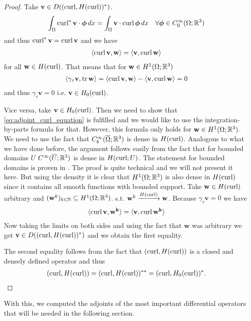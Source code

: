 \documentclass[../master_thesis.tex]{subfiles}
\begin{document}
\begin{proof}
    Take $\mathbf{v} \in D((\operatorname{curl}, H(\operatorname{curl}))^*)$. 
    \begin{align*}
        \int_\Omega \operatorname{curl}^*\mathbf{v} \cdot \boldsymbol{\phi} \, dx
        = \int_\Omega \mathbf{v} \cdot \operatorname{curl} \boldsymbol{\phi} \, dx
            \quad \forall \boldsymbol{\phi} \in C_0^\infty(\Omega;\mathbb{R}^3)
    \end{align*}
    and thus $\operatorname{curl}^* \mathbf{v} = \operatorname{curl} \mathbf{v}$ and we have 
    \begin{align}
        \langle \operatorname{curl} \mathbf{v}, \mathbf{w} \rangle
        = \langle \mathbf{v}, \operatorname{curl} \mathbf{w} \rangle \label{eq:adjoint_curl_equation}
    \end{align}
    for all $\mathbf{w} \in H(\operatorname{curl})$. That means that for $\mathbf{w} \in H^1(\Omega;\mathbb{R}^3)$
    \begin{align*}
        \langle \gamma_\tau \mathbf{v}, \operatorname{tr} \mathbf{w} \rangle 
        =  \langle \operatorname{curl} \mathbf{v}, \mathbf{w} \rangle - \langle \mathbf{v}, \operatorname{curl} \mathbf{w} \rangle
        = 0
    \end{align*}
    and thus $\gamma_\tau \mathbf{v} = 0$ i.e. $\mathbf{v} \in H_0(\operatorname{curl})$.

    Vice versa, take $\mathbf{v} \in H_0(\operatorname{curl})$. Then we need to show that 
    \ref{eq:adjoint_curl_equation} is fulfilled and we would like to use the integration-by-parts formula 
    for that. However, this formula only holds for $\mathbf{w} \in H^1(\Omega;\mathbb{R}^3)$. 
    We need to use the fact that $C_b^\infty(\overline{\Omega};\mathbb{R}^3)$ is 
    dense in $H(\operatorname{curl})$. Analogous to what we have done before, the argument follows easily from the fact that 
    for bounded domains $U$ $C^\infty(\overline{U};\mathbb{R}^3)$ is dense in $H(\operatorname{curl};U)$. 
    The statement for bounded domains is proven in \cite[Lemma 3.27]{monk}. 
    The proof is quite technical 
    and we will not present it here. But using the density it is clear that 
    $H^1(\Omega;\mathbb{R}^3)$ is also dense in $H(\operatorname{curl})$ since it contains all smooth functions 
    with bounded support. Take $\mathbf{w} \in H(\operatorname{curl})$ arbitrary and 
    $(\mathbf{w}^k)_{k \in \mathbb{N}} \subseteq H^1(\Omega;\mathbb{R}^3)$.
    s.t. $\mathbf{w}^k \xrightarrow{H(\operatorname{curl})} \mathbf{w}$.
    Because $\gamma_\tau \mathbf{v} = 0$ we have 
    \begin{align*}
        \langle \operatorname{curl} \mathbf{v}, \mathbf{w^k} \rangle
        = \langle \mathbf{v}, \operatorname{curl} \mathbf{w^k} \rangle
    \end{align*}
    Now taking the limits on both sides and using the fact that $\mathbf{w}$ was 
    arbitrary we get $\mathbf{v} \in D((\operatorname{curl}, H(\operatorname{curl}))^*)$ and 
    we obtain the first equality. 

    The second equality follows from the fact that $(\operatorname{curl}, H(\operatorname{curl}))$ is 
    a closed and densely defined operator and thus 
    \begin{align*}
        (\operatorname{curl}, H(\operatorname{curl}))= (\operatorname{curl}, H(\operatorname{curl}))^{**} = (\operatorname{curl}, H_0(\operatorname{curl}))^*.
    \end{align*}
\end{proof}
With this, we computed the adjoints of the most important differential operators that 
will be needed in the following section. 
\end{document}
